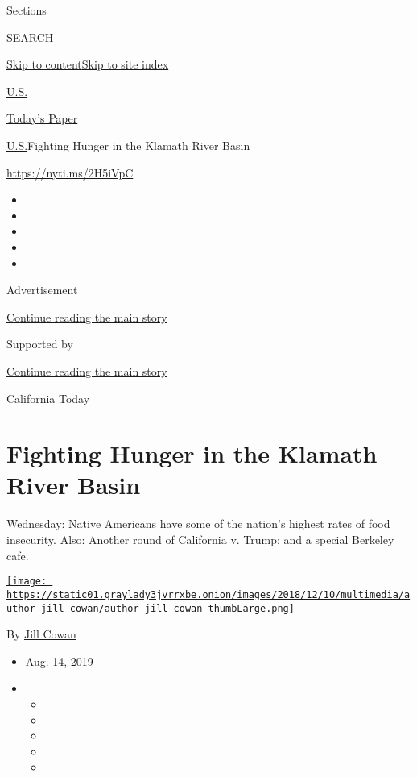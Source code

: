 Sections

SEARCH

\protect\hyperlink{site-content}{Skip to
content}\protect\hyperlink{site-index}{Skip to site index}

\href{https://www.nytimes3xbfgragh.onion/section/us}{U.S.}

\href{https://myaccount.nytimes3xbfgragh.onion/auth/login?response_type=cookie\&client_id=vi}{}

\href{https://www.nytimes3xbfgragh.onion/section/todayspaper}{Today's
Paper}

\href{/section/us}{U.S.}\textbar{}Fighting Hunger in the Klamath River
Basin

\url{https://nyti.ms/2H5iVpC}

\begin{itemize}
\item
\item
\item
\item
\item
\end{itemize}

Advertisement

\protect\hyperlink{after-top}{Continue reading the main story}

Supported by

\protect\hyperlink{after-sponsor}{Continue reading the main story}

California Today

\hypertarget{fighting-hunger-in-the-klamath-river-basin}{%
\section{Fighting Hunger in the Klamath River
Basin}\label{fighting-hunger-in-the-klamath-river-basin}}

Wednesday: Native Americans have some of the nation's highest rates of
food insecurity. Also: Another round of California v. Trump; and a
special Berkeley cafe.

\href{https://www.nytimes3xbfgragh.onion/by/jill-cowan}{\texttt{[image: https://static01.graylady3jvrrxbe.onion/images/2018/12/10/multimedia/author-jill-cowan/author-jill-cowan-thumbLarge.png]}}

By \href{https://www.nytimes3xbfgragh.onion/by/jill-cowan}{Jill Cowan}

\begin{itemize}
\item
  Aug. 14, 2019
\item
  \begin{itemize}
  \item
  \item
  \item
  \item
  \item
  \end{itemize}
\end{itemize}

